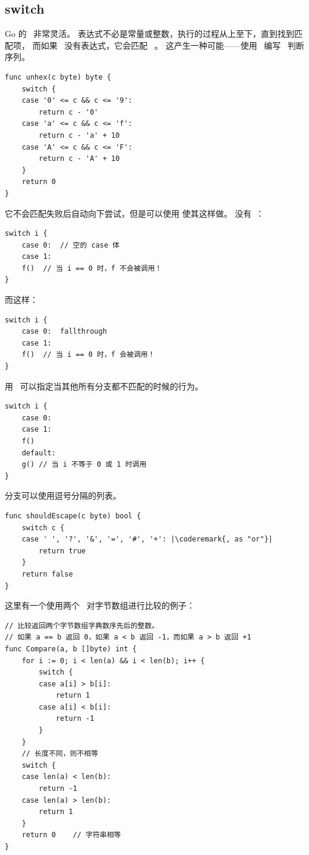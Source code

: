 \subsection{switch}
Go 的~ 非常灵活。
表达式不必是常量或整数，执行的过程从上至下，直到找到匹配项，
而如果~ 没有表达式，它会匹配~ 。
这产生一种可能——使用~ 编写~ 判断序列。
\begin{lstlisting}
func unhex(c byte) byte {
    switch {
    case '0' <= c && c <= '9':
        return c - '0'
    case 'a' <= c && c <= 'f':
        return c - 'a' + 10
    case 'A' <= c && c <= 'F':
        return c - 'A' + 10
    }
    return 0
}
\end{lstlisting}
它不会匹配失败后自动向下尝试，但是可以使用
使其这样做。
没有~：
\begin{lstlisting}
switch i {
    case 0:  // 空的 case 体
    case 1:
	f()  // 当 i == 0 时，f 不会被调用！
}
\end{lstlisting}
而这样：
\begin{lstlisting}
switch i {
    case 0:  fallthrough
    case 1:
	f()  // 当 i == 0 时，f 会被调用！
}
\end{lstlisting}
用~ 可以指定当其他所有分支都不匹配的时候的行为。
\begin{lstlisting}
switch i {
    case 0:  
    case 1:
	f()
    default:	
	g()	// 当 i 不等于 0 或 1 时调用
}
\end{lstlisting}

分支可以使用逗号分隔的列表。
\begin{lstlisting}
func shouldEscape(c byte) bool {
    switch c {
    case ' ', '?', '&', '=', '#', '+': |\coderemark{, as "or"}|
        return true
    }
    return false
}
\end{lstlisting}

这里有一个使用两个~ 对字节数组进行比较的例子：
\begin{lstlisting}
// 比较返回两个字节数组字典数序先后的整数。
// 如果 a == b 返回 0，如果 a < b 返回 -1，而如果 a > b 返回 +1
func Compare(a, b []byte) int {
    for i := 0; i < len(a) && i < len(b); i++ {
        switch {
        case a[i] > b[i]:
            return 1
        case a[i] < b[i]:
            return -1
        }
    }
    // 长度不同，则不相等
    switch {
    case len(a) < len(b):
        return -1
    case len(a) > len(b):
        return 1
    }
    return 0	// 字符串相等
}
\end{lstlisting}


